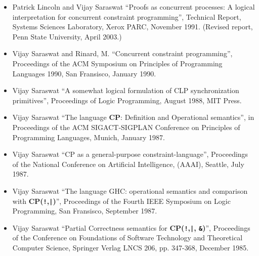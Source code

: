 \documentclass{article}
\begin{document}
\begin{itemize}
\item Patrick Lincoln and Vijay Saraswat ``Proofs as concurrent
  processes: A logical interpretation for concurrent constraint
  programming'', Technical Report, Systems Sciences Laboratory, Xerox
  PARC, November 1991. (Revised report, Penn State University, April
  2003.)
  
\item  Vijay Saraswat and Rinard, M. ``Concurrent constraint
  programming'', Proceedings of the ACM Symposium on
  Principles of Programming Languages 1990, San Fransisco, January
  1990.
  
\item  Vijay Saraswat ``A somewhat logical formulation of CLP
  synchronization primitives'', Proceedings of Logic Programming,
  August 1988, MIT Press.
  
\item  Vijay Saraswat ``The language {\bf CP}: Definition and
  Operational semantics'', in Proceedings of the ACM
  SIGACT-SIGPLAN Conference on Principles of Programming
  Languages, Munich, January 1987.
  
\item  Vijay Saraswat ``{\sf CP} as a general-purpose
  constraint-language'', Proceedings of the National
  Conference on Artificial Intelligence, (AAAI), Seattle, July
  1987.
  
\item  Vijay Saraswat ``The language GHC: operational semantics
  and comparison with {\bf CP({\tt !},{\tt |})}'', Proceedings of the
  Fourth IEEE Symposium on Logic Programming, San Fransisco,
  September 1987.
  
\item  Vijay Saraswat ``Partial Correctness semantics for {\bf
  CP({\tt !},{\tt |}, {\tt \&})}'', Proceedings of the Conference on
  Foundations of Software Technology and Theoretical Computer
  Science, Springer Verlag LNCS 206, pp. 347-368, December 1985.
\end{itemize}
\end{document}
